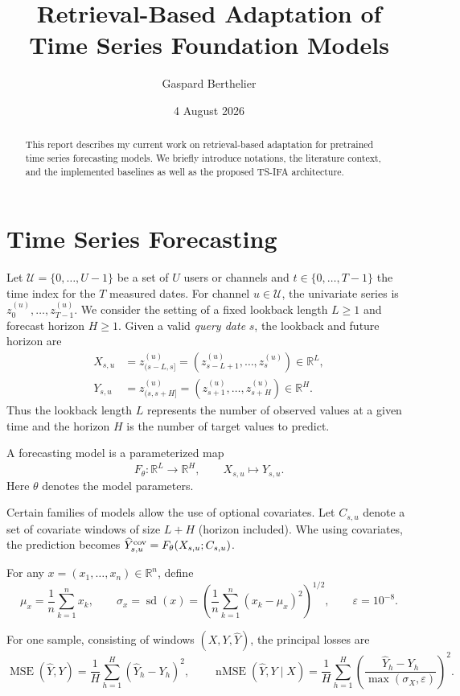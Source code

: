\documentclass[10pt]{article}
\title{\vspace{-1.5em}\textbf{Retrieval-Based Adaptation of \\Time Series Foundation Models}\vspace{-0.4em}}
\author{Gaspard Berthelier}
\date{4 August 2026}
\newcommand{\reals}{\mathbb{R}}
\newcommand{\sd}{\operatorname{sd}}
\newcommand{\MSE}{\operatorname{MSE}}
\newcommand{\nMSE}{\operatorname{nMSE}}
\begin{document}
\maketitle

\begin{abstract}
This report describes my current work on retrieval-based adaptation for pretrained time series forecasting models. We briefly introduce notations,
the literature context, and the implemented baselines as well as the proposed TS-IFA architecture.
\end{abstract}

\tableofcontents

\section{Time Series Forecasting}
\label{sec:forecasting}

Let $\mathcal U=\{0,\ldots,U-1\}$ be a set of $U$ users or channels and
$t\in\{0,\ldots,T-1\}$ the time index for the $T$ measured dates. For channel
$u\in\mathcal U$, the univariate series is
$z^{(u)}_0,\ldots,z^{(u)}_{T-1}$. We consider the setting of a fixed lookback length $L\geq1$ and forecast
horizon $H\geq1$. Given a valid \emph{query date} $s$, the lookback and future horizon are
\begin{align}
 X_{s,u}
 &= z^{(u)}_{(s-L,s]}
  = (z^{(u)}_{s-L+1},\ldots,z^{(u)}_s)\in\reals^L,\\
 Y_{s,u}
 &= z^{(u)}_{(s,s+H]}
  = (z^{(u)}_{s+1},\ldots,z^{(u)}_{s+H})\in\reals^H.
\end{align}
Thus the lookback length $L$ represents the number of observed values at a given time and the horizon $H$ is the number of target values to predict.

A forecasting model is a parameterized map
\[
 F_\theta:\reals^L\longrightarrow\reals^H,
 \qquad X_{s,u}\longmapsto \widehat Y_{s,u}.
\]
Here $\theta$ denotes the model parameters.

Certain families of models allow the use of optional covariates. Let $C_{s,u}$ denote a set of covariate windows of size $L+H$ (horizon included).
Whe using covariates, the prediction becomes $\widehat Y^{\rm cov}_{s,u}=F_\theta(X_{s,u};C_{s,u})$.

For any $x=(x_1,\ldots,x_n)\in\reals^n$, define
\[
 \mu_x=\frac1n\sum_{k=1}^n x_k,
 \qquad
 \sigma_x=\sd(x)=\left(\frac1n\sum_{k=1}^n(x_k-\mu_x)^2\right)^{1/2},
 \qquad \varepsilon=10^{-8}.
\]

For one sample, consisting of windows $(X,Y,\widehat Y)$, the principal losses are
\[
 \MSE(\widehat Y,Y)=\frac1H\sum_{h=1}^H(\widehat Y_h-Y_h)^2,
 \qquad
 \nMSE(\widehat Y,Y\mid X)
 =\frac1H\sum_{h=1}^H
 \left(\frac{\widehat Y_h-Y_h}{\max(\sigma_X,\varepsilon)}\right)^2.
\]
\end{document}
